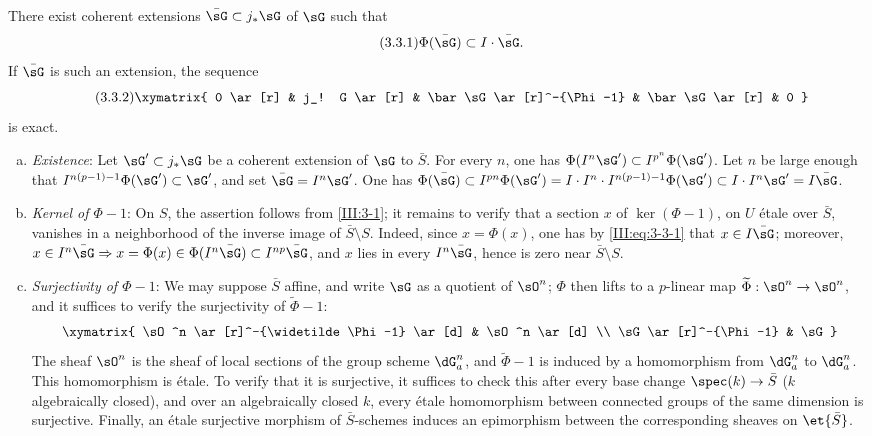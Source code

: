 \documentclass[oneside]{book}
\begin{document}
\begin{lemma_}\label{III:3-3}
There exist coherent extensions $\bar\sG\subset j_*\sG$ of $\sG$ such that
\begin{equation*}\tag{3.3.1}\label{III:eq:3-3-1}
  \Phi(\bar\sG)\subset I\cdot \bar\sG\text{.}
\end{equation*}
If $\bar\sG$ is such an extension, the sequence
\begin{equation*}\tag{3.3.2}\label{III:eq:3-3-2}
\xymatrix{
  0 \ar[r]
    & j_! G \ar[r]
    & \bar\sG \ar[r]^-{\Phi-1}
    & \bar\sG \ar[r]
    & 0
}
\end{equation*}
is exact.
\end{lemma_}
\begin{enumerate}[a)]
  \item \emph{Existence}: Let $\sG'\subset j_*\sG$ be a coherent extension
    of $\sG$ to $\bar S$. For every $n$, one has
    $\Phi(I^n \sG')\subset I^{p^n}\Phi(\sG')$. Let $n$ be large enough that
    $I^{n(p-1)-1}\Phi(\sG')\subset \sG'$, and set $\bar\sG=I^n\sG'$.
    One has $\Phi(\bar\sG)\subset I^{p n}\Phi(\sG')
    =I\cdot I^n\cdot I^{n(p-1)-1}\Phi(\sG')\subset I\cdot I^n\sG'
    = I\bar\sG$.
  \item \emph{Kernel of $\Phi-1$}: On $S$, the assertion follows from
    \ref{III:3-1}; it remains to verify that a section $x$ of
    $\ker(\Phi-1)$, on $U$ étale over $\bar S$, vanishes in a neighborhood of
    the inverse image of $\bar S\setminus S$. Indeed, since $x=\Phi(x)$, one
    has by \eqref{III:eq:3-3-1} that $x\in I\bar\sG$; moreover,
    $x\in I^n\bar\sG\Rightarrow x=\Phi(x)\in\Phi(I^n\bar\sG)\subset I^{n p}\bar\sG$, and $x$ lies in every $I^n\bar\sG$, hence is zero near
    $\bar S\setminus S$.
  \item \emph{Surjectivity of $\Phi-1$}: We may suppose $\bar S$ affine, and
    write $\sG$ as a quotient of $\sO^n$; $\Phi$ then lifts to a $p$-linear
    map $\widetilde\Phi:\sO^n\to\sO^n$, and it suffices to verify the
    surjectivity of $\widetilde\Phi-1$:
    \[\xymatrix{
      \sO^n \ar[r]^-{\widetilde \Phi-1} \ar[d]
        & \sO^n \ar[d] \\
      \sG \ar[r]^-{\Phi-1}
        & \sG
    }\]
    The sheaf $\sO^n$ is the sheaf of local sections of the group scheme
    $\dG_a^n$, and $\widetilde\Phi-1$ is induced by a homomorphism from
    $\dG_a^n$ to $\dG_a^n$. This homomorphism is étale. To verify that it is
    surjective, it suffices to check this after every base change
    $\spec(k)\to\bar S$ ($k$ algebraically closed), and over an algebraically
    closed $k$, every étale homomorphism between connected groups of the same
    dimension is surjective. Finally, an étale surjective morphism of
    $\bar S$-schemes induces an epimorphism between the corresponding sheaves
    on $\et{\bar S}$.
\end{enumerate}
\end{document}
